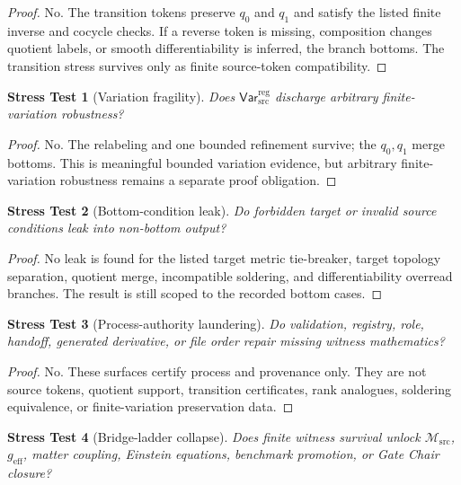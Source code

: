 \documentclass[11pt]{article}
\newcommand{\Msrc}{\mathcal{M}_{\mathrm{src}}}
\newcommand{\geff}{g_{\mathrm{eff}}}
\newcommand{\VarRegSrc}{\mathsf{Var}^{\mathrm{reg}}_{\mathrm{src}}}
\newtheorem{stress}{Stress Test}
\begin{document}
\begin{proof}
No. The transition tokens preserve \(q_0\) and \(q_1\) and satisfy the listed
finite inverse and cocycle checks. If a reverse token is missing, composition
changes quotient labels, or smooth differentiability is inferred, the branch
bottoms. The transition stress survives only as finite source-token
compatibility.
\end{proof}

\begin{stress}[Variation fragility]
Does \(\VarRegSrc\) discharge arbitrary finite-variation robustness?
\end{stress}

\begin{proof}
No. The relabeling and one bounded refinement survive; the \(q_0,q_1\) merge
bottoms. This is meaningful bounded variation evidence, but arbitrary
finite-variation robustness remains a separate proof obligation.
\end{proof}

\begin{stress}[Bottom-condition leak]
Do forbidden target or invalid source conditions leak into non-bottom output?
\end{stress}

\begin{proof}
No leak is found for the listed target metric tie-breaker, target topology
separation, quotient merge, incompatible soldering, and differentiability
overread branches. The result is still scoped to the recorded bottom cases.
\end{proof}

\begin{stress}[Process-authority laundering]
Do validation, registry, role, handoff, generated derivative, or file order
repair missing witness mathematics?
\end{stress}

\begin{proof}
No. These surfaces certify process and provenance only. They are not source
tokens, quotient support, transition certificates, rank analogues, soldering
equivalence, or finite-variation preservation data.
\end{proof}

\begin{stress}[Bridge-ladder collapse]
Does finite witness survival unlock \(\Msrc\), \(\geff\), matter coupling,
Einstein equations, benchmark promotion, or Gate Chair closure?
\end{stress}
\end{document}
